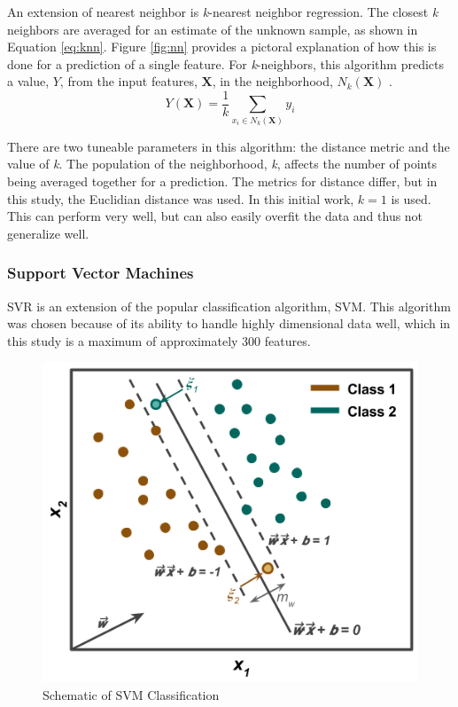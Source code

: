 An extension of nearest neighbor is \textit{k}-nearest neighbor regression.
The closest \textit{k} neighbors are averaged for an estimate of the unknown
sample, as shown in Equation \ref{eq:knn}.  Figure \ref{fig:nn} provides a
pictoral explanation of how this is done for a prediction of a single feature.
For \textit{k}-neighbors, this algorithm predicts a value, $Y$, from the input
features, $\boldsymbol{X}$, in the neighborhood, $N_k (\boldsymbol{X})$
\cite{elements_stats}. 
\begin{equation}
  Y(\boldsymbol{X}) = \frac{1}{k} \sum_{x_i \in N_k(\boldsymbol{X})} y_i
  \label{eq:knn}
\end{equation}

There are two tuneable parameters in this algorithm: the distance metric and
the value of \textit{k}.  The population of the neighborhood, \textit{k},
affects the number of points being averaged together for a prediction.  The
metrics for distance differ, but in this study, the Euclidian distance was
used. In this initial work, $k = 1$ is used. This can perform very well, but
can also easily overfit the data and thus not generalize well. 

\subsubsection{Support Vector Machines}
\label{sec:svm}

\Acrfull{SVR} is an extension of the popular classification algorithm, \acrfull{SVM}.
This algorithm was chosen because of its ability to handle highly dimensional
data well, which in this study is a maximum of approximately 300 features. 

\begin{figure}[!htb]
  \centering
  \includegraphics[width=0.8\linewidth]{./chapters/litrev/svm.png}
  \caption{Schematic of \acrshort{SVM} Classification}
  \label{fig:svm}
\end{figure}

